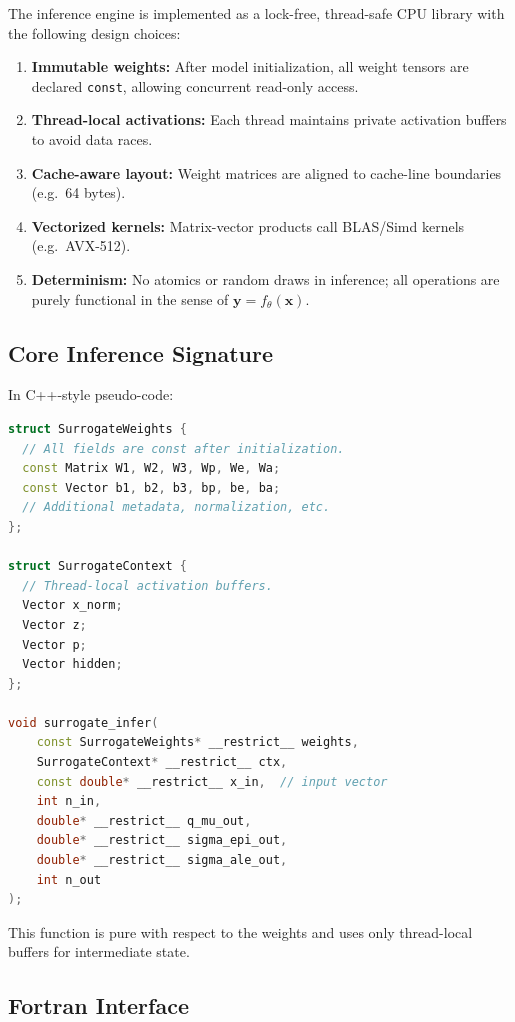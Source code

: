 \documentclass[11pt]{article}
\begin{document}
The inference engine is implemented as a lock-free, thread-safe CPU library with the following design choices:

\begin{enumerate}[label=(\alph*)]
  \item \textbf{Immutable weights:} After model initialization, all weight tensors are declared \texttt{const}, allowing concurrent read-only access.
  \item \textbf{Thread-local activations:} Each thread maintains private activation buffers to avoid data races.
  \item \textbf{Cache-aware layout:} Weight matrices are aligned to cache-line boundaries (e.g.\ 64 bytes).
  \item \textbf{Vectorized kernels:} Matrix-vector products call BLAS/Simd kernels (e.g.\ AVX-512).
  \item \textbf{Determinism:} No atomics or random draws in inference; all operations are purely functional in the sense of $\bm{y} = f_\theta(\bm{x})$.
\end{enumerate}

\subsection{Core Inference Signature}

In C++-style pseudo-code:

\begin{lstlisting}[style=code,language=C++]
struct SurrogateWeights {
  // All fields are const after initialization.
  const Matrix W1, W2, W3, Wp, We, Wa;
  const Vector b1, b2, b3, bp, be, ba;
  // Additional metadata, normalization, etc.
};

struct SurrogateContext {
  // Thread-local activation buffers.
  Vector x_norm;
  Vector z;
  Vector p;
  Vector hidden;
};

void surrogate_infer(
    const SurrogateWeights* __restrict__ weights,
    SurrogateContext* __restrict__ ctx,
    const double* __restrict__ x_in,  // input vector
    int n_in,
    double* __restrict__ q_mu_out,
    double* __restrict__ sigma_epi_out,
    double* __restrict__ sigma_ale_out,
    int n_out
);
\end{lstlisting}

This function is pure with respect to the weights and uses only thread-local buffers for intermediate state.

\subsection{Fortran Interface}
\end{document}
